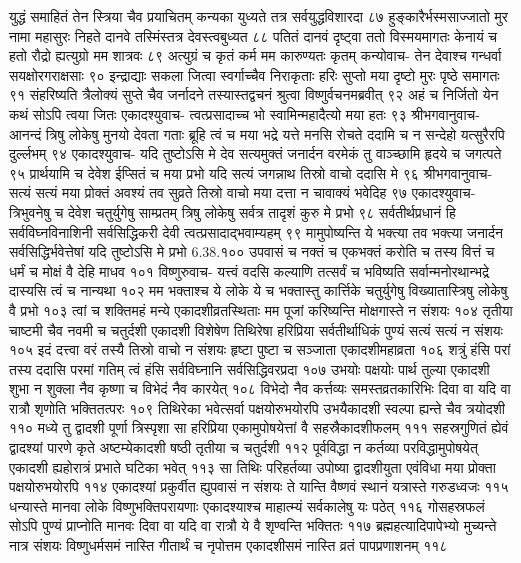 युद्धं समाहितं तेन स्त्रिया चैव प्रयाचितम् 
कन्यका युध्यते तत्र सर्वयुद्धविशारदा ८७
हुङ्कारैर्भस्मसाज्जातो मुर नामा महासुरः 
निहते दानवे तस्मिंस्तत्र देवस्त्वबुध्यत ८८
पतितं दानवं दृष्ट्वा ततो विस्मयमागतः 
केनायं च हतो रौद्रो ह्यत्युग्रो मम शात्रवः ८९
अत्युग्रं च कृतं कर्म मम कारुण्यतः कृतम् 
कन्योवाच-
तेन देवाश्च गन्धर्वा सयक्षोरगराक्षसाः ९०
इन्द्राद्याः सकला जित्वा स्वर्गाच्चैव निराकृताः 
हरिः सुप्तो मया दृष्टो मुरः पृष्ठे समागतः ९१
संहरिष्यति त्रैलोक्यं सुप्ते चैव जर्नादने 
तस्यास्तद्वचनं श्रुत्वा विष्णुर्वचनमब्रवीत् ९२
अहं च निर्जितो येन कथं सोऽपि त्वया जितः 
एकादश्युवाच-
त्वत्प्रसादाच्च भो स्वामिन्महादैत्यो मया हतः ९३
श्रीभगवानुवाच-
आनन्दं त्रिषु लोकेषु मुनयो देवता गताः 
ब्रूहि त्वं च मया भद्रे यत्ते मनसि रोचते 
ददामि च न सन्देहो यत्सुरैरपि दुर्ल्लभम् ९४
एकादश्युवाच-
यदि तुष्टोऽसि मे देव सत्यमुक्तं जनार्दन 
वरमेकं तु वाञ्च्छामि हृदये च जगत्पते ९५
प्रार्थयामि च देवेश ईप्सितं च मया प्रभो 
यदि सत्यं जगन्नाथ तिस्रो वाचो ददासि मे ९६
श्रीभगवानुवाच-
सत्यं सत्यं मया प्रोक्तं अवश्यं तव सुव्रते 
तिस्रो वाचो मया दत्ता न चावाक्यं भवेदिह ९७
एकादश्युवाच-
त्रिभुवनेषु च देवेश चतुर्युगेषु साम्प्रतम् 
त्रिषु लोकेषु सर्वत्र तादृशं कुरु मे प्रभो ९८
सर्वतीर्थप्रधानं हि सर्वविघ्नविनाशिनी 
सर्वसिद्धिकरी देवी त्वत्प्रसादाद्भवाम्यहम् ९९
मामुपोष्यन्ति ये भक्त्या तव भक्त्या जनार्दन 
सर्वसिद्धिर्भवेत्तेषां यदि तुष्टोऽसि मे प्रभो 6.38.१००
उपवासं च नक्तं च एकभक्तं करोति च 
तस्य वित्तं च धर्मं च मोक्षं वै देहि माधव १०१
विष्णुरुवाच-
यत्त्वं वदसि कल्याणि तत्सर्वं च भविष्यति 
सर्वान्मनोरथान्भद्रे दास्यसि त्वं च नान्यथा १०२
मम भक्ताश्च ये लोके ये च भक्तास्तु कार्त्तिके 
चतुर्युगेषु विख्यातास्त्रिषु लोकेषु वै प्रभो १०३
त्वां च शक्तिमहं मन्ये एकादशीव्रतस्थिताः 
मम पूजां करिष्यन्ति मोक्षगास्ते न संशयः १०४
तृतीया चाष्टमी चैव नवमी च चतुर्दशी 
एकादशी विशेषेण तिथिरेषा हरिप्रिया 
सर्वतीर्थाधिकं पुण्यं सत्यं सत्यं न संशयः १०५
इदं दत्त्वा वरं तस्यै तिस्रो वाचो न संशयः 
हृष्टा पुष्टा च सञ्जाता एकादशीमहाव्रता १०६
शत्रुं हंसि परां तस्य ददासि परमां गतिम् 
त्वं हंसि सर्वविघ्नानि सर्वसिद्धिवरप्रदा १०७
उभयोः पक्षयोः पार्थ तुल्या एकादशी शुभा 
न शुक्ला नैव कृष्णा च विभेदं नैव कारयेत् १०८
विभेदो नैव कर्त्तव्यः समस्तव्रतकारिभिः 
दिवा वा यदि वा रात्रौ शृणोति भक्तितत्परः १०९
तिथिरेका भवेत्सर्वा पक्षयोरुभयोरपि 
उभयैकादशी स्वल्पा ह्यन्ते चैव त्रयोदशी ११०
मध्ये तु द्वादशी पूर्णा त्रिस्पृशा सा हरिप्रिया 
एकामुपोषयेत्तां वै सहस्रैकादशीफलम् १११
सहस्रगुणितं ह्येवं द्वादश्यां पारणे कृते 
अष्टम्येकादशी षष्ठी तृतीया च चतुर्दशी ११२
पूर्वविद्धा न कर्तव्या परविद्धामुपोषयेत् 
एकादशी ह्यहोरात्रं प्रभाते घटिका भवेत् ११३
सा तिथिः परिहर्तव्या उपोष्या द्वादशीयुता 
एवंविधा मया प्रोक्ता पक्षयोरुभयोरपि ११४
एकादश्यां प्रकुर्वीत ह्युपवासं न संशयः 
ते यान्ति वैष्णवं स्थानं यत्रास्ते गरुडध्वजः ११५
धन्यास्ते मानवा लोके विष्णुभक्तिपरायणाः 
एकादश्याश्च माहात्म्यं सर्वकालेषु यः पठेत् ११६
गोसहस्रफलं सोऽपि पुण्यं प्राप्नोति मानवः 
दिवा वा यदि वा रात्रौ ये वै शृण्वन्ति भक्तितः ११७
ब्रह्महत्यादिपापेभ्यो मुच्यन्ते नात्र संशयः 
विष्णुधर्मसमं नास्ति गीतार्थं च नृपोत्तम 
एकादशीसमं नास्ति व्रतं पापप्रणाशनम् ११८

